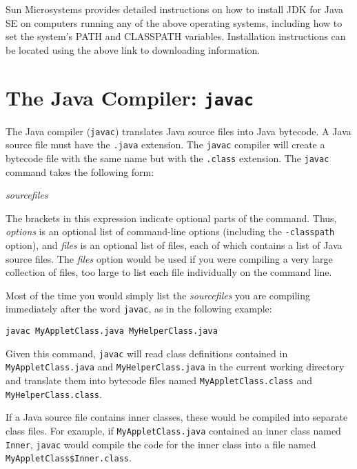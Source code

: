 \noindent Sun Microsystems provides detailed instructions on how
to install JDK for Java SE on computers running any of the above operating
systems, including how to set the system's PATH and CLASSPATH variables.
Installation instructions can be located using the above link to
downloading information.

\section*{The Java Compiler: {\tt javac}}
\noindent The Java compiler ({\tt javac}) translates Java source files into Java
bytecode.  A Java source file must have the {\tt .java} extension.   The
{\tt javac} compiler will create a bytecode file with the same name
but with the {\tt .class} extension.  The {\tt javac} command takes
the following form:

\vspace{6pt plus3pt minus2pt}
 \qquad 
 [ {\it options} ] \qquad 
 {\it sourcefiles} \qquad 
 [ {\it files} ]

\vspace{6pt plus3pt minus2pt}\noindent The brackets in this expression indicate optional parts of
the command.   Thus, {\it options} is an optional list of command-line options 
(including the {\tt -classpath} option), and
{\it files} is an optional list of files, each of which contains a
list of Java source files.   The {\it files} option would be used if
you were compiling a very large collection of files, too large to list
each file individually on the command line.

Most of the time you would simply list the {\it sourcefiles} you are
compiling immediately after the word {\tt javac}, as in the
following example:

\begin{jjjlisting}
\begin{lstlisting}
javac MyAppletClass.java MyHelperClass.java
\end{lstlisting}
\end{jjjlisting}

\noindent Given this command, {\tt javac} will read class
definitions contained in {\tt MyAppletClass.java} and {\tt MyHelperClass.java}
in the current working directory
and translate them into bytecode files named {\tt MyAppletClass.class} and
{\tt MyHelperClass.class}.

If a Java source file contains inner classes, these would be compiled
into separate class files.  For example, if {\tt MyAppletClass.java}
contained an inner class named {\tt Inner}, {\tt javac} would compile
the code for the inner class into a file named {\tt
MyAppletClass\$Inner.class}.

